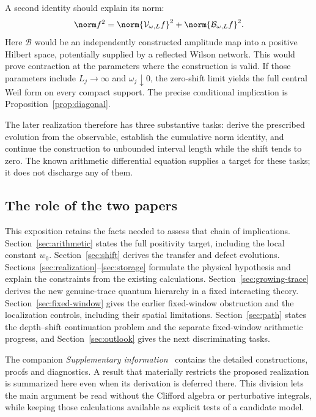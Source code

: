 A second identity should explain its norm:
\[
 \norm f^2=\norm{\mathcal V_{\omega,L}f}^2+
                 \norm{\mathcal B_{\omega,L}f}^2.
\]
Here $\mathcal B$ would be an independently constructed amplitude
map into a positive Hilbert space, potentially supplied by a
reflected Wilson network. This would prove contraction at the
parameters where the construction is valid. If those parameters
include $L_j\to\infty$ and $\omega_j\downarrow0$, the zero-shift
limit yields the full central Weil form on every compact support.
The precise conditional implication is
Proposition~\ref{prop:diagonal}.

The later realization therefore has three substantive tasks: derive the prescribed
evolution from the observable, establish the cumulative norm
identity, and continue the construction to unbounded interval
length while the shift tends to zero. The known arithmetic
differential equation supplies a target for these tasks; it does
not discharge any of them.

\subsection{The role of the two papers}

This exposition retains the facts needed to assess that chain of
implications. Section~\ref{sec:arithmetic} states the full positivity
target, including the local constant $w_0$.
Section~\ref{sec:shift} derives the transfer and defect evolutions.
Sections~\ref{sec:realization}--\ref{sec:storage} formulate the
physical hypothesis and explain the constraints from the existing
calculations. Section~\ref{sec:growing-trace} derives the new genuine-trace
quantum hierarchy in a fixed interacting theory.
Section~\ref{sec:fixed-window} gives the earlier fixed-window obstruction
and the localization controls, including their spatial limitations.
Section~\ref{sec:path} states the depth--shift continuation problem and
the separate fixed-window arithmetic progress, and Section~\ref{sec:outlook} gives the next
discriminating tasks.

The companion \emph{Supplementary information}~\cite{Supplement}
contains the detailed constructions, proofs and diagnostics.
A result that materially restricts the proposed realization is
summarized here even when its derivation is deferred there.
This division lets the main argument be read without the Clifford
algebra or perturbative integrals, while keeping those calculations
available as explicit tests of a candidate model.


